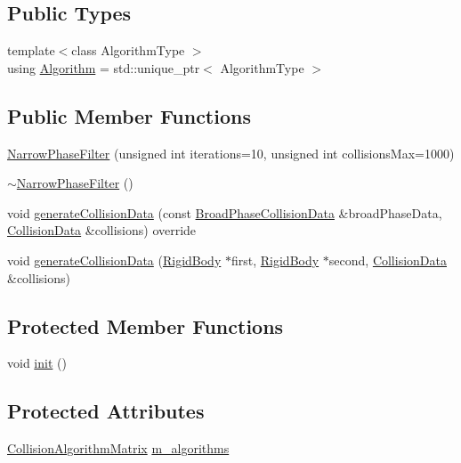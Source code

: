 \subsection*{Public Types}
\begin{DoxyCompactItemize}
\item 
{\footnotesize template$<$class Algorithm\+Type $>$ }\\using \mbox{\hyperlink{classr3_1_1_narrow_phase_filter_aebe310c944167ad73abf098ccc68ed88}{Algorithm}} = std\+::unique\+\_\+ptr$<$ Algorithm\+Type $>$
\end{DoxyCompactItemize}
\subsection*{Public Member Functions}
\begin{DoxyCompactItemize}
\item 
\mbox{\hyperlink{classr3_1_1_narrow_phase_filter_ad3696d7d4a1d0cfd1b383802a4504897}{Narrow\+Phase\+Filter}} (unsigned int iterations=10, unsigned int collisions\+Max=1000)
\item 
\mbox{\hyperlink{classr3_1_1_narrow_phase_filter_acd99c99da07750756ae37fa5641136cb}{$\sim$\+Narrow\+Phase\+Filter}} ()
\item 
void \mbox{\hyperlink{classr3_1_1_narrow_phase_filter_a44da84d1dbc12e9f95af46aac270ebb8}{generate\+Collision\+Data}} (const \mbox{\hyperlink{classr3_1_1_broad_phase_collision_data}{Broad\+Phase\+Collision\+Data}} \&broad\+Phase\+Data, \mbox{\hyperlink{classr3_1_1_collision_data}{Collision\+Data}} \&collisions) override
\item 
void \mbox{\hyperlink{classr3_1_1_narrow_phase_filter_a567743be66c7e8d118165ec92ed68cdf}{generate\+Collision\+Data}} (\mbox{\hyperlink{classr3_1_1_rigid_body}{Rigid\+Body}} $\ast$first, \mbox{\hyperlink{classr3_1_1_rigid_body}{Rigid\+Body}} $\ast$second, \mbox{\hyperlink{classr3_1_1_collision_data}{Collision\+Data}} \&collisions)
\end{DoxyCompactItemize}
\subsection*{Protected Member Functions}
\begin{DoxyCompactItemize}
\item 
void \mbox{\hyperlink{classr3_1_1_narrow_phase_filter_a09742dd02960fab328444144fb22b85b}{init}} ()
\end{DoxyCompactItemize}
\subsection*{Protected Attributes}
\begin{DoxyCompactItemize}
\item 
\mbox{\hyperlink{classr3_1_1_collision_algorithm_matrix}{Collision\+Algorithm\+Matrix}} \mbox{\hyperlink{classr3_1_1_narrow_phase_filter_a476cf750e3cd55d9e36a011eb0c447af}{m\+\_\+algorithms}}
\end{DoxyCompactItemize}


